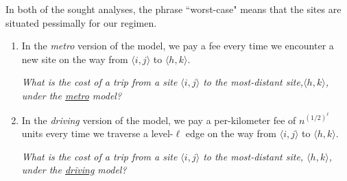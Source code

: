 \begin{itemize}
%
%
%

In both of the sought analyses, the phrase ``worst-case" means that the sites are situated pessimally for our regimen.
  \begin{enumerate}
  \item
In the {\em metro} version of the model, we pay a fee every time we encounter a new site on the way from $\langle i,j \rangle$ to $\langle h,k \rangle$.

\smallskip

{\em What is the cost of a trip from a site $\langle i,j \rangle$ to the most-distant site,$\langle h,k \rangle$, under the \underline{metro} model?}

  \medskip\item
In the {\em driving} version of the model, we pay a per-kilometer fee of $n^{(1/2)^\ell}$ units every time we traverse a level-$\ell$ edge on the way from $\langle i,j \rangle$ to $\langle h,k \rangle$.
 
 \smallskip

{\em What is the cost of a trip from a site $\langle i,j \rangle$ to the most-distant site, $\langle h,k \rangle$, under the \underline{driving} model?}


\end{enumerate}
\end{itemize}
